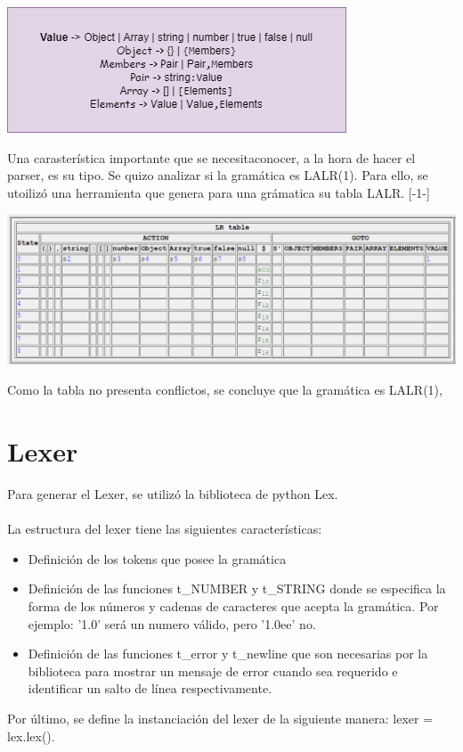 \documentclass{article}
\begin{document}
\begin{center}
\includegraphics[scale=0.9]{img2.png}
\end{center}

Una carasterística importante que se necesitaconocer, a la hora de hacer el parser, es su tipo. Se quizo analizar si la gramática es LALR(1). Para ello, se utoilizó una herramienta que genera para una grámatica su tabla LALR. [-1-]
\begin{center}
\includegraphics[scale=0.55]{img3.png}
\end{center}
Como la tabla no presenta conflictos, se concluye que la gramática es LALR(1),

\section{Lexer}

Para generar el Lexer, se utilizó la biblioteca de python Lex. \\ \\
La estructura del lexer tiene las siguientes características:
\begin{itemize}
    \item Definición de los tokens que posee la gramática
    \item Definición de las funciones t\_NUMBER y t\_STRING donde se especifica la forma de los números y cadenas de caracteres que acepta la gramática. Por ejemplo: '1.0' será un numero válido, pero '1.0ee' no.
    \item Definición de las funciones t\_error y t\_newline que son necesarias por la biblioteca para mostrar un mensaje de error cuando sea requerido e identificar un salto de línea respectivamente.
\end{itemize}
Por último, se define la instanciación del lexer de la siguiente manera: lexer = lex.lex().
\end{document}
